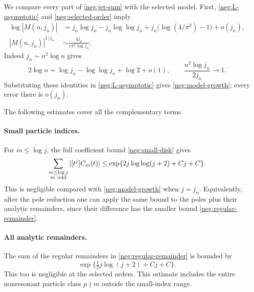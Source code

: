 \documentclass[11pt]{article}
\numberwithin{equation}{section}
\theoremstyle{definition}
\begin{document}
We compare every part of \eqref{neg:jet-sum} with the selected
model.  First, \eqref{neg:L-asymptotic} and
\eqref{neg:selected-order} imply
\begin{align}
 \log|M(n,j_n)|
 &=j_n\log j_n-j_n\log\log j_n
          +j_n\bigl(\log(4/\pi^2)-1\bigr)+o(j_n),
 \label{neg:model-growth}\\
 |M(n,j_n)|^{1/j_n}
 &\sim\frac{4j_n}{e\pi^2\log j_n}.
 \label{neg:model-root}
\end{align}
Indeed \(j_n\sim n^2\log n\) gives
\[
 2\log n=\log j_n-\log\log j_n+\log2+o(1),\qquad
 \frac{n^2\log j_n}{2j_n}\longrightarrow1.
\]
Substituting these identities in \eqref{neg:L-asymptotic} gives
\eqref{neg:model-growth}; every error there is \(o(j_n)\).

The following estimates cover all the complementary terms.

\paragraph{Small particle indices.}
For \(m\le\log j\), the full coefficient bound
\eqref{neg:small-disk} gives
\begin{equation}
 \sum_{\substack{m\le\log j\\m\ {\rm odd}}}
       |[t^j]C_m(t)|
 \le \exp\{2j\log\log(j+2)+Cj+C\}.
 \label{neg:small-indices}
\end{equation}
This is negligible compared with \eqref{neg:model-growth}
when \(j=j_n\).  Equivalently, after the pole reduction one
can apply the same bound to the poles plus their analytic
remainders, since their difference has the smaller bound
\eqref{neg:regular-remainder}.

\paragraph{All analytic remainders.}
The sum of the regular remainders in
\eqref{neg:regular-remainder} is bounded by
\begin{equation}
 \exp\{\tfrac12j\log(j+2)+Cj+C\}.
 \label{neg:all-remainders}
\end{equation}
This too is negligible at the selected orders.  This estimate
includes the entire nonresonant particle class \(p\nmid m\)
outside the small-index range.
\end{document}
